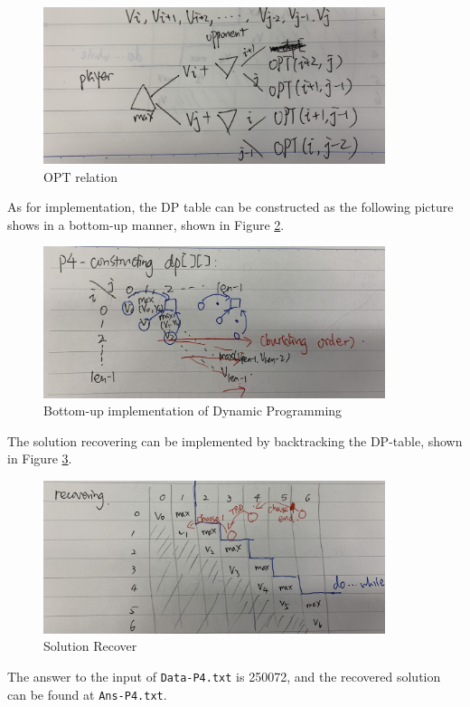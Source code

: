 \begin{exercise}[]
\begin{solution}
  \begin{figure}
    \centering
    \includegraphics[width=10cm]{img/ex4-1.png}
    \caption{OPT relation\label{fig:ex1}}
  \end{figure}


  As for implementation, the DP table can be constructed as the following picture shows in a bottom-up manner, shown in Figure \ref{fig:ex2}.
  
  \begin{figure}
    \centering
    \includegraphics[width=10cm]{img/ex4-2.png}
    \caption{Bottom-up implementation of Dynamic Programming\label{fig:ex2}}
  \end{figure}
  
  The solution recovering can be implemented by backtracking the DP-table, shown in Figure \ref{fig:ex3}.

  \begin{figure}
    \centering
    \includegraphics[width=10cm]{img/ex4-3.png}
    \caption{Solution Recover\label{fig:ex3}}
  \end{figure}

  The answer to the input of \texttt{Data-P4.txt} is 250072, and the recovered solution can be found at \texttt{Ans-P4.txt}.

  \end{solution}
  \label{ex4}
\end{exercise}